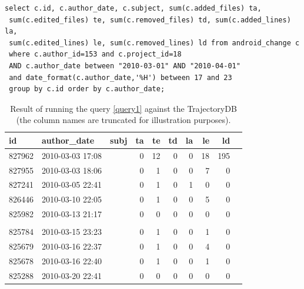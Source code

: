 \documentclass[a4paper,10pt]{article}
\numberwithin{equation}{subsection}
\begin{document}
\noindent\begin{minipage}{\textwidth}
\begin{lstlisting}[label=query1,caption=Data summary retrieval SQL query]
select c.id, c.author_date, c.subject, sum(c.added_files) ta, 
 sum(c.edited_files) te, sum(c.removed_files) td, sum(c.added_lines) la, 
 sum(c.edited_lines) le, sum(c.removed_lines) ld from android_change c 
 where c.author_id=153 and c.project_id=18 
 AND c.author_date between "2010-03-01" AND "2010-04-01"
 and date_format(c.author_date,'%H') between 17 and 23
 group by c.id order by c.author_date;
\end{lstlisting}
\end{minipage}
\begin{table}[hb]
\noindent\begin{minipage}{\textwidth}
  \tiny
  \caption{Result of running the query \ref{query1} against the TrajectoryDB (the column names are truncated for illustration purposes). }
  \begin{tabularx}{\textwidth}{ | l | l | X | r | r | r | r | r | r | r |}
  \hline           
id & author\_date & subj & ta & te & td & la & le & ld\\ 
\hline           
827962 & 2010-03-03 17:08 & \verb7sparc64: Kill off old sys_perfctr system call and state.7 & 0 & 12 & 0 & 0 & 18 & 195\\ 
827955 & 2010-03-03 18:06 & \verb1sparc64: Make prom entry spinlock NMI safe.1 & 0 & 1 & 0 & 0 & 7 & 0\\ 
827241 & 2010-03-05 22:41 & \verb1timbgpio: fix build1 & 0 & 1 & 0 & 1 & 0 & 0\\ 
826446 & 2010-03-10 22:05 & \verb1uartlite: Fix build on sparc.1 & 0 & 1 & 0 & 0 & 5 & 0\\ 
825982 & 2010-03-13 21:17 & \verb1Merge branch 'master' of1 & 0 & 0 & 0 & 0 & 0 & 0\\
& & \verb1git://git.kernel.org/pub/scm/linux/kernel/git/linville/wireless-2.61 &  &  &  &  &  & \\  
825784 & 2010-03-15 23:23 & \verb7e100: Fix ring parameter change handling regression.7 & 0 & 1 & 0 & 0 & 1 & 0\\ 
825679 & 2010-03-16 22:37 & \verb1bridge: Make first arg to deliver_clone const.1 & 0 & 1 & 0 & 0 & 4 & 0\\ 
825678 & 2010-03-16 22:40 & \verb7sunxvr1000: Add missing FB=y depenency.7 & 0 & 1 & 0 & 0 & 1 & 0\\ 
825288 & 2010-03-20 22:41 & \verb1Merge branch 'vhost' of 1 & 0 & 0 & 0 & 0 & 0 & 0\\

\end{tabularx}
\end{minipage}
\end{table}
\end{document}
